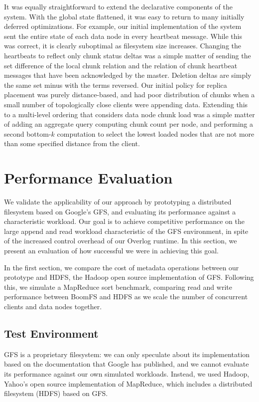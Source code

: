 \documentclass[twocolumn]{article}
\begin{document}
It was equally straightforward to extend the declarative components of
the system.  With the global state flattened, it was easy to return to
many initially deferred optimizations.  For example, our initial
implementation of the system sent the entire state of each data node
in every heartbeat message. While this was correct, it is clearly
suboptimal as filesystem size increases.  Changing the heartbeats to
reflect only chunk status deltas was a simple matter of sending the
set difference of the local chunk relation and the relation of chunk
heartbeat messages that have been acknowledged by the master.
Deletion deltas are simply the same set minus with the terms reversed.
Our initial policy for replica placement was purely distance-based,
and had poor distribution of chunks when a small number of
topologically close clients were appending data.  Extending this to a
multi-level ordering that considers data node chunk load was a simple
matter of adding an aggregate query computing chunk count per node,
and performing a second bottom-$k$ computation to select the lowest
loaded nodes that are not more than some specified distance from the
client.

\section{Performance Evaluation}
\label{perf-eval}
We validate the applicability of our approach by prototyping a
distributed filesystem based on Google's GFS, and evaluating its
performance against a characteristic workload.  Our goal is to achieve
competitive performance on the large append and read workload
characteristic of the GFS environment, in spite of the increased
control overhead of our Overlog runtime.  In this section, we
present an evaluation of how successful we were in achieving this
goal.

In the first section, we compare the cost of metadata operations
between our prototype and HDFS, the Hadoop open source implementation
of GFS.  Following this, we simulate a MapReduce sort benchmark,
comparing read and write performance between BoomFS and HDFS as we scale
the number of concurrent clients and data nodes together.

\subsection{Test Environment}
GFS is a proprietary filesystem: we can only speculate about its
implementation based on the documentation that Google has published,
and we cannot evaluate its performance against our own simulated
workloads.  Instead, we used Hadoop, Yahoo's open source
implementation of MapReduce, which includes a distributed filesystem
(HDFS) based on GFS.
\end{document}
